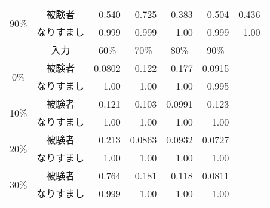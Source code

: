 \begin{center}
\begin{longtable}[btph]{|c|c|r|r|r|r|r|}
      \multirow{2}{*}{90\%} & 被験者 & 0.540 & 0.725 & 0.383 & 0.504 & 0.436 \\ \cline{2-7}
           & なりすまし & 0.999 & 0.999 & 1.00 & 0.999 & 1.00 \\ \hline \hline
      \multicolumn{1}{|c|}{} & \multicolumn{1}{c|}{入力} & \multicolumn{1}{c|}{60\%} & \multicolumn{1}{c|}{70\%} & \multicolumn{1}{c|}{80\%} & \multicolumn{1}{c|}{90\%} & \multicolumn{1}{c|}{} \\ \hline
      \multirow{2}{*}{0\%}  & 被験者 & 0.0802 & 0.122  & 0.177  & 0.0915 & \\ \cline{2-7}
           & なりすまし & 1.00 & 1.00 & 1.00 & 0.995 & \\ \hline
      \multirow{2}{*}{10\%} & 被験者 & 0.121  & 0.103  & 0.0991  & 0.123  & \\ \cline{2-7}
           & なりすまし & 1.00 & 1.00 & 1.00 & 1.00 & \\ \hline
      \multirow{2}{*}{20\%} & 被験者 & 0.213  & 0.0863 & 0.0932 & 0.0727 & \\ \cline{2-7}
           & なりすまし & 1.00 & 1.00 & 1.00 & 1.00 & \\ \hline
      \multirow{2}{*}{30\%} & 被験者 & 0.764  & 0.181  & 0.118  & 0.0811 & \\ \cline{2-7}
           & なりすまし & 0.999 & 1.00 & 1.00 & 1.00 & \\ \hline

\end{longtable}
\end{center}
